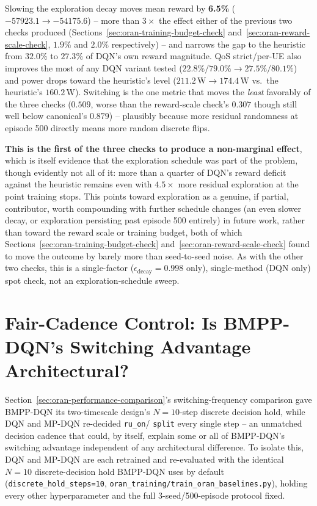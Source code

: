 Slowing the exploration decay moves mean reward by \textbf{6.5\%}
($-57923.1 \to -54175.6$) -- more than $3\times$ the effect either of the
previous two checks produced (Sections~\ref{sec:oran-training-budget-check}
and~\ref{sec:oran-reward-scale-check}, $1.9\%$ and $2.0\%$ respectively)
-- and narrows the gap to the heuristic from $32.0\%$ to $27.3\%$ of
DQN's own reward magnitude. QoS strict/per-UE also improves the most of
any DQN variant tested ($22.8\%/79.0\% \to 27.5\%/80.1\%$) and power
drops toward the heuristic's level ($211.2\,\mathrm{W} \to
174.4\,\mathrm{W}$ vs.\ the heuristic's $160.2\,\mathrm{W}$). Switching
is the one metric that moves the \emph{least} favorably of the three
checks ($0.509$, worse than the reward-scale check's $0.307$ though
still well below canonical's $0.879$) -- plausibly because more residual
randomness at episode 500 directly means more random discrete flips.

\textbf{This is the first of the three checks to produce a
non-marginal effect}, which is itself evidence that the exploration
schedule was part of the problem, though evidently not all of it: more
than a quarter of DQN's reward deficit against the heuristic remains
even with $4.5\times$ more residual exploration at the point training
stops. This points toward exploration as a genuine, if partial,
contributor, worth compounding with further schedule changes (an even
slower decay, or exploration persisting past episode 500 entirely) in
future work, rather than toward the reward scale or training budget,
both of which Sections~\ref{sec:oran-training-budget-check}
and~\ref{sec:oran-reward-scale-check} found to move the outcome by
barely more than seed-to-seed noise. As with the other two checks, this
is a single-factor ($\epsilon_{\text{decay}}=0.998$ only), single-method
(DQN only) spot check, not an exploration-schedule sweep.

\section{Fair-Cadence Control: Is BMPP-DQN's Switching Advantage Architectural?}
\label{sec:oran-cadence-control}

{\sloppy
Section~\ref{sec:oran-performance-comparison}'s switching-frequency
comparison gave BMPP-DQN its two-timescale design's $N=10$-step discrete
decision hold, while DQN and MP-DQN re-decided \texttt{ru\_on}/
\texttt{split} every single step -- an unmatched decision cadence that
could, by itself, explain some or all of BMPP-DQN's switching advantage
independent of any architectural difference. To isolate this, DQN and
MP-DQN are each retrained and re-evaluated with the identical $N=10$
discrete-decision hold BMPP-DQN uses by default
(\texttt{discrete\_hold\_steps=10},
\texttt{oran\_training/\allowbreak train\_oran\_baselines.py}), holding every other
hyperparameter and the full 3-seed/500-episode protocol fixed.
\par}

